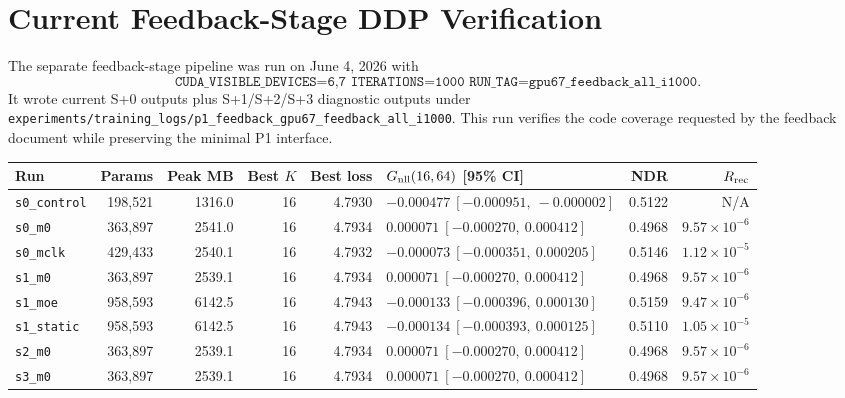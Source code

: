 \documentclass[11pt]{article}
\newcommand{\code}[1]{\texttt{#1}}
\begin{document}
\section{Current Feedback-Stage DDP Verification}
\label{sec:feedback-stage-run}

The separate feedback-stage pipeline was run on June 4, 2026 with
\[
\code{CUDA\_VISIBLE\_DEVICES=6,7\ ITERATIONS=1000\ RUN\_TAG=gpu67\_feedback\_all\_i1000}.
\]
It wrote current S+0 outputs plus S+1/S+2/S+3 diagnostic outputs under
\code{experiments/training\_logs/p1\_feedback\_gpu67\_feedback\_all\_i1000}.  This run verifies
the code coverage requested by the feedback document while preserving the minimal P1 interface.

\begin{center}
\scriptsize
\setlength{\tabcolsep}{3pt}
\renewcommand{\arraystretch}{1.12}
\begin{tabularx}{\textwidth}{@{}L{0.15\textwidth} r r r r L{0.23\textwidth} r r@{}}
\toprule
\textbf{Run} & \textbf{Params} & \textbf{Peak MB} & \textbf{Best \(K\)} & \textbf{Best loss} & \textbf{\(G_{\rm nll}(16,64)\) [95\% CI]} & \textbf{NDR} & \textbf{\(R_{\rm rec}\)} \\
\midrule
\code{s0\_control} & 198{,}521 & 1316.0 & 16 & 4.7930 & \(-0.000477\ [-0.000951,\ -0.000002]\) & 0.5122 & N/A \\
\code{s0\_m0} & 363{,}897 & 2541.0 & 16 & 4.7934 & \(0.000071\ [-0.000270,\ 0.000412]\) & 0.4968 & \(9.57{\times}10^{-6}\) \\
\code{s0\_mclk} & 429{,}433 & 2540.1 & 16 & 4.7932 & \(-0.000073\ [-0.000351,\ 0.000205]\) & 0.5146 & \(1.12{\times}10^{-5}\) \\
\code{s1\_m0} & 363{,}897 & 2539.1 & 16 & 4.7934 & \(0.000071\ [-0.000270,\ 0.000412]\) & 0.4968 & \(9.57{\times}10^{-6}\) \\
\code{s1\_moe} & 958{,}593 & 6142.5 & 16 & 4.7943 & \(-0.000133\ [-0.000396,\ 0.000130]\) & 0.5159 & \(9.47{\times}10^{-6}\) \\
\code{s1\_static} & 958{,}593 & 6142.5 & 16 & 4.7943 & \(-0.000134\ [-0.000393,\ 0.000125]\) & 0.5110 & \(1.05{\times}10^{-5}\) \\
\code{s2\_m0} & 363{,}897 & 2539.1 & 16 & 4.7934 & \(0.000071\ [-0.000270,\ 0.000412]\) & 0.4968 & \(9.57{\times}10^{-6}\) \\
\code{s3\_m0} & 363{,}897 & 2539.1 & 16 & 4.7934 & \(0.000071\ [-0.000270,\ 0.000412]\) & 0.4968 & \(9.57{\times}10^{-6}\) \\
\bottomrule
\end{tabularx}
\end{center}
\end{document}
